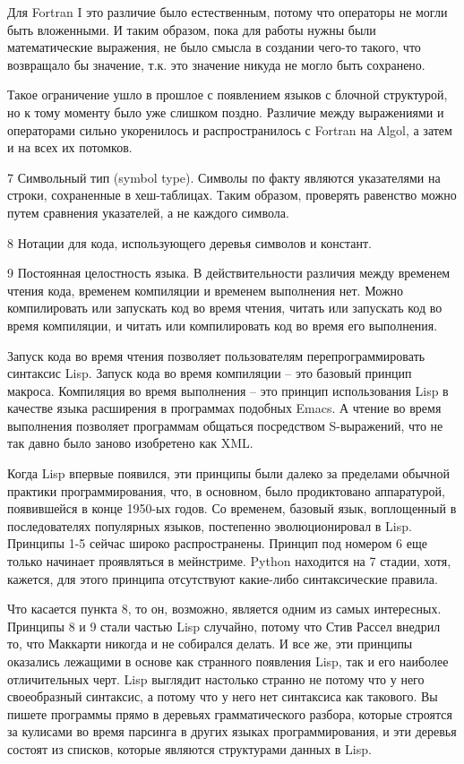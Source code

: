 \documentclass[ebook,12pt,oneside,openany]{memoir}
\begin{document}
Для Fortran I это различие было естественным, потому что операторы не
могли быть вложенными. И таким образом, пока для работы нужны были
математические выражения, не было смысла в создании чего-то такого,
что возвращало бы значение, т.к. это значение никуда не могло быть
сохранено.

Такое ограничение ушло в прошлое с появлением языков с блочной
структурой, но к тому моменту было уже слишком поздно. Различие между
выражениями и операторами сильно укоренилось и распространилось с
Fortran на Algol, а затем и на всех их потомков.

7 Символьный тип (symbol type). Символы по факту являются указателями
на строки, сохраненные в хеш-таблицах. Таким образом, проверять
равенство можно путем сравнения указателей, а не каждого символа.

8 Нотации для кода, использующего деревья символов и констант.

9 Постоянная целостность языка. В действительности различия между
временем чтения кода, временем компиляции и временем выполнения нет.
Можно компилировать или запускать код во время чтения, читать или
запускать код во время компиляции, и читать или компилировать код во
время его выполнения.

Запуск кода во время чтения позволяет пользователям
перепрограммировать синтаксис Lisp. Запуск кода во время компиляции –
это базовый принцип макроса. Компиляция во время выполнения – это
принцип использования Lisp в качестве языка расширения в программах
подобных Emacs. А чтение во время выполнения позволяет программам
общаться посредством S-выражений, что не так давно было заново
изобретено как XML.

Когда Lisp впервые появился, эти принципы были далеко за пределами
обычной практики программирования, что, в основном, было продиктовано
аппаратурой, появившейся в конце 1950-ых годов. Со временем, базовый
язык, воплощенный в последователях популярных языков, постепенно
эволюционировал в Lisp. Принципы 1-5 сейчас широко распространены.
Принцип под номером 6 еще только начинает проявляться в мейнстриме.
Python находится на 7 стадии, хотя, кажется, для этого принципа
отсутствуют какие-либо синтаксические правила.

Что касается пункта 8, то он, возможно, является одним из самых
интересных. Принципы 8 и 9 стали частью Lisp случайно, потому что Стив
Рассел внедрил то, что Маккарти никогда и не собирался делать. И все
же, эти принципы оказались лежащими в основе как странного появления
Lisp, так и его наиболее отличительных черт. Lisp выглядит настолько
странно не потому что у него своеобразный синтаксис, а потому что у
него нет синтаксиса как такового. Вы пишете программы прямо в деревьях
грамматического разбора, которые строятся за кулисами во время
парсинга в других языках программирования, и эти деревья состоят из
списков, которые являются структурами данных в Lisp.
\end{document}
